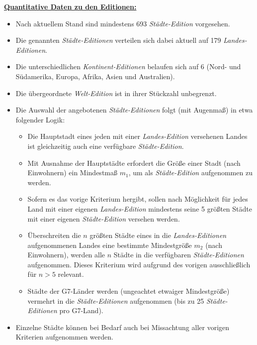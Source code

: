 \vspace{0.4cm}

\underline{\textbf{Quantitative Daten zu den Editionen:}}

\begin{itemize}
    \item Nach aktuellem Stand sind mindestens 693 \textit{Städte-Edition} vorgesehen.
    \item Die genannten \textit{Städte-Editionen} verteilen sich dabei aktuell auf 179 \textit{Landes-Editionen}.
    \item Die unterschiedlichen \textit{Kontinent-Editionen} belaufen sich auf 6 (Nord- und Südamerika, Europa, Afrika, Asien und Australien).
    \item Die übergeordnete \textit{Welt-Edition} ist in ihrer Stückzahl unbegrenzt. 
    \item Die Auswahl der angebotenen \textit{Städte-Editionen} folgt (mit Augenmaß) in etwa folgender Logik:
    \begin{itemize}
    	\item Die Hauptstadt eines jeden mit einer \textit{Landes-Edition} versehenen Landes ist gleichzeitig auch eine verfügbare \textit{Städte-Edition}.
    	\item Mit Ausnahme der Hauptstädte erfordert die Größe einer Stadt (nach Einwohnern) ein Mindestmaß $m_1$, um als \textit{Städte-Edition} aufgenommen zu werden.
    	\item Sofern es das vorige Kriterium hergibt, sollen nach Möglichkeit für jedes Land mit einer eigenen \textit{Landes-Edition} mindestens seine 5 größten Städte mit einer eigenen \textit{Städte-Edition} versehen werden.
    	\item Überschreiten die $n$ größten Städte eines in die \textit{Landes-Editionen} aufgenommenen Landes eine bestimmte Mindestgröße $m_2$ (nach Einwohnern), werden alle $n$ Städte in die verfügbaren \textit{Städte-Editionen} aufgenommen. Dieses Kriterium wird aufgrund des vorigen ausschließlich für $n > 5$ relevant.
    	\item Städte der G7-Länder werden (ungeachtet etwaiger Mindestgröße) vermehrt in die \textit{Städte-Editionen} aufgenommen (bis zu 25 \textit{Städte-Editionen} pro G7-Land).
    \end{itemize} 
    \item Einzelne Städte können bei Bedarf auch bei Missachtung aller vorigen Kriterien aufgenommen werden.
\end{itemize}

\vspace{0.5cm}




